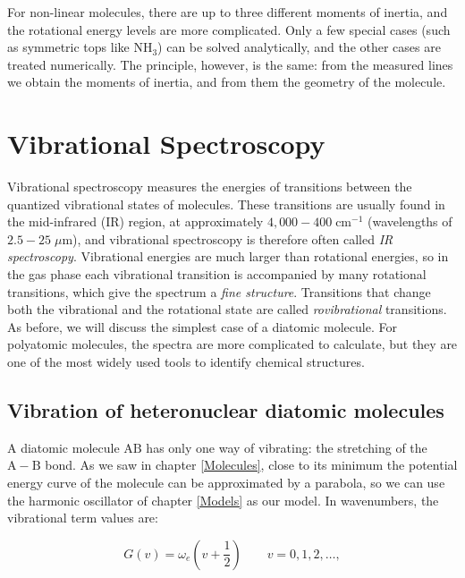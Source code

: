\documentclass[
  english,
  9pt,
]{extbook}
\theoremstyle{definition}
\theoremstyle{definition}
\theoremstyle{definition}
\theoremstyle{definition}
\theoremstyle{remark}
\begin{document}
For non-linear molecules, there are up to three different moments of inertia, and the rotational energy levels are more complicated. Only a few special cases (such as symmetric tops like \(\mathrm{NH}_3\)) can be solved analytically, and the other cases are treated numerically. The principle, however, is the same: from the measured lines we obtain the moments of inertia, and from them the geometry of the molecule.

\section{Vibrational Spectroscopy}\label{vibrational-spectroscopy}

Vibrational spectroscopy measures the energies of transitions between the quantized vibrational states of molecules. These transitions are usually found in the mid-infrared (IR) region, at approximately \(4{,}000-400\;\text{cm}^{-1}\) (wavelengths of \(2.5-25\;\mu \text{m}\)), and vibrational spectroscopy is therefore often called \emph{IR spectroscopy}. Vibrational energies are much larger than rotational energies, so in the gas phase each vibrational transition is accompanied by many rotational transitions, which give the spectrum a \emph{fine structure}. Transitions that change both the vibrational and the rotational state are called \emph{rovibrational} transitions. As before, we will discuss the simplest case of a diatomic molecule. For polyatomic molecules, the spectra are more complicated to calculate, but they are one of the most widely used tools to identify chemical structures.

\subsection{Vibration of heteronuclear diatomic molecules}\label{vibration-of-heteronuclear-diatomic-molecules}

A diatomic molecule \(\mathrm{AB}\) has only one way of vibrating: the stretching of the \(\mathrm{A}-\mathrm{B}\) bond. As we saw in chapter \ref{Molecules}, close to its minimum the potential energy curve of the molecule can be approximated by a parabola, so we can use the harmonic oscillator of chapter \ref{Models} as our model. In wavenumbers, the vibrational term values are:

\begin{equation}
G(v) = \omega_e \left( v + \frac{1}{2} \right) \qquad v=0,1,2,\ldots,
\label{eq:vib1}
\end{equation}
\end{document}
